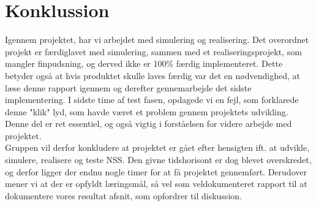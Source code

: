 \graphicspath{{Chapters/Konklussion/}}


\section{Konklussion}
Igennem projektet, har vi arbejdet med simulering og realisering. Det overordnet projekt er færdiglavet med simulering, sammen med et realiseringsprojekt, som mangler finpudsning, og derved ikke er 100\% færdig implementeret. Dette betyder også at hvis produktet skulle laves færdig var det en nødvendighed, at læse denne rapport igennem og derefter gennemarbejde det sidste implementering. I sidste time af test fasen, opdagede vi en fejl, som forklarede denne "klik" lyd, som havde været et problem gennem projektets udvikling. Denne del er ret essentiel, og også vigtig i forståelsen for videre arbejde med projektet. \\
Gruppen vil derfor konkludere at projektet er gået efter hensigten ift. at udvikle, simulere, realisere og teste NSS. Den givne tidshorisont er dog blevet overskredet, og derfor ligger der endnu nogle timer for at få projektet gennemført. Derudover mener vi at der er opfyldt læringsmål, så vel som veldokumenteret rapport til at dokumentere vores resultat afsnit, som opfordrer til diskussion. 
